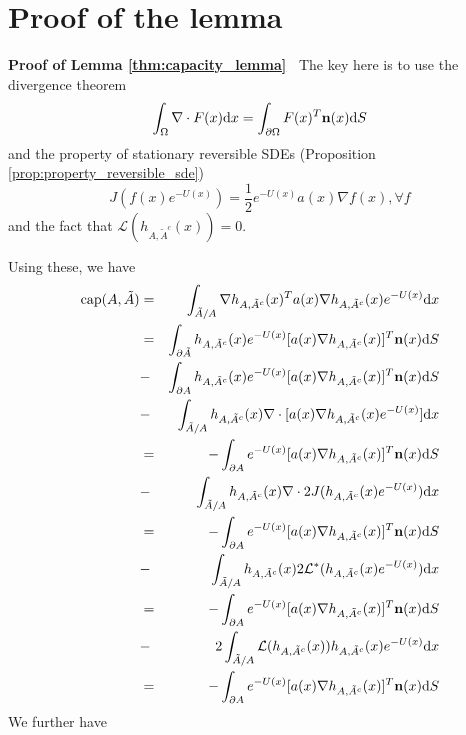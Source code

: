 \documentclass[english, aip, jcp, priprint, graphicx,floatfix]{revtex4-1}
\newcommand{\mathd}{\mathrm{d}}
\newcommand{\tmop}[1]{\ensuremath{\operatorname{#1}}}
\theoremstyle{plain}
\theoremstyle{definition}
\theoremstyle{plain}
\begin{document}
\section{Proof of the lemma}\label{sec:proof_lemma}

\noindent\textbf{Proof of Lemma \ref{thm:capacity_lemma}\ }
The key here is to use the divergence theorem
\[ \int_{\Omega} \nabla \cdot F (x) \mathd x = \int_{\partial \Omega} F (x)^T
{\textbf n} (x) \mathd S \]
and the property of stationary reversible SDEs (Proposition \ref{prop:property_reversible_sde})
\[ J (f (x) e^{- U (x)}) = \frac{1}{2} e^{- U (x)} a (x) \nabla f (x), \forall f \]
and the fact that $\mathcal{L} (h_{A, \tilde{A}^c} (x)) = 0$.

Using these, we have
\begin{eqnarray*}
\tmop{cap} (A, \tilde{A}) & = & \int_{\tilde{A} / A} \nabla h_{A,
\tilde{A}^c} (x)^T a (x) \nabla h_{A, \tilde{A}^c} (x) e^{- U (x)} \mathd
x\\
& = & \int_{\partial \tilde{A}} h_{A, \tilde{A}^c} (x) e^{- U (x)} [a (x)
\nabla h_{A, \tilde{A}^c} (x)]^T {\textbf n} (x) \mathd S\\
& - & \int_{\partial A} h_{A, \tilde{A}^c} (x) e^{- U (x)} [a (x) \nabla
h_{A, \tilde{A}^c} (x)]^T {\textbf n} (x) \mathd S\\
& - & \int_{\tilde{A} / A} h_{A, \tilde{A}^c} (x) \nabla \cdot [a (x)
\nabla h_{A, \tilde{A}^c} (x) e^{- U (x)}] \mathd x\\
& = & - \int_{\partial A} e^{- U (x)} [a (x) \nabla h_{A, \tilde{A}^c}
(x)]^T {\textbf n} (x) \mathd S\\
& - & \int_{\tilde{A} / A} h_{A, \tilde{A}^c} (x) \nabla \cdot 2 J (h_{A,
\tilde{A}^c} (x) e^{- U (x)}) \mathd x\\
& = & - \int_{\partial A} e^{- U (x)} [a (x) \nabla h_{A, \tilde{A}^c}
(x)]^T {\textbf n} (x) \mathd S\\
& - & \int_{\tilde{A} / A} h_{A, \tilde{A}^c} (x) 2 \mathcal{L}^{\ast}
(h_{A, \tilde{A}^c} (x) e^{- U (x)}) \mathd x\\
& = & - \int_{\partial A} e^{- U (x)} [a (x) \nabla h_{A, \tilde{A}^c}
(x)]^T {\textbf n} (x) \mathd S\\
& - & 2 \int_{\tilde{A} / A} \mathcal{L} (h_{A, \tilde{A}^c} (x)) h_{A,
\tilde{A}^c} (x) e^{- U (x)} \mathd x\\
& = & - \int_{\partial A} e^{- U (x)} [a (x) \nabla h_{A, \tilde{A}^c}
(x)]^T {\textbf n} (x) \mathd S
\end{eqnarray*}
We further have
\end{document}
